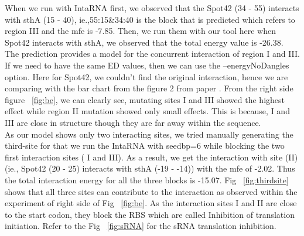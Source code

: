 \documentclass[twoside,a4paper]{report}
\numberwithin{equation}{section}
\begin{document}
When we run with IntaRNA first, we observed that the Spot42 (34 - 55) interacts with sthA (15 - 40), ie.,55:15\&34:40 is the block that is predicted which refers to region III and the mfe is -7.85. Then, we run them with our tool here when Spot42 interacts with sthA, we observed that the total energy value is -26.38. The prediction provides a model for the concurrent interaction of region I and III. If we need to have the same ED values, then we can use the --energyNoDangles option. Here for Spot42, we couldn't find the original interaction, hence we are comparing with the bar chart from the figure 2 from paper {\citep{beisel2011base}}. From the right side figure ~\ref{fig:be}, we can clearly see, mutating sites I and III showed the highest effect while region II mutation showed only small effects. This is because, I and III are close in structure though they are far away within the sequence.\\

As our model shows only two interacting sites, we tried manually generating the third-site for that we run the IntaRNA with seedbp=6 while blocking the two first interaction sites ( I and III). As a result, we get the interaction with site (II) (ie., Spot42 (20 - 25) interacts with sthA (-19 - -14)) with the mfe of -2.02. Thus the total interaction energy for all the three blocks is -15.07.  Fig ~\ref{fig:thirdsite} shows that all three sites can contribute to the interaction as observed within the experiment of right side of Fig ~\ref{fig:be}. As the interaction sites I and II are close to the start codon, they block the RBS which are called Inhibition of translation initiation. Refer to the Fig ~\ref{fig:sRNA} for the sRNA translation inhibition. \\


\end{document}
